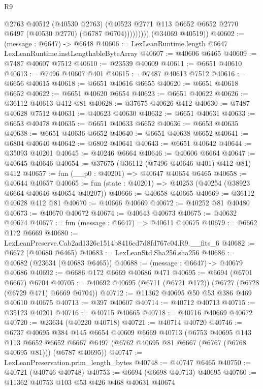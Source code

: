 \begin{lexlean}{R9}
\begin{coremodule}
                    @2763
                    @40512
                    (@40530 @2763)
                    (@40523 @2771 @113 @6652 @6652 @2770 @6497 (@40530 @2770) (@6787 @6704)))))))))
      (@34069 @40519))
@40602 := (message : @6647) -> @6648
@40606 := LexLeanRuntime.length @6647 LexLeanRuntime.instLengthableByteArray
@40607 := @40606 @6465
@40609 := @7487 @40607 @7512
@40610 := @23539 @40609
@40611 := @6651 @40610
@40613 := @7496 @40607 @401
@40615 := @7487 @40613 @7512
@40616 := @6656 @40615
@40618 := @6651 @40616 @6655
@40620 := @6651 @40618 @6652
@40622 := @6651 @40620 @6654
@40623 := @6651 @40622
@40626 := @36112 @40613 @412 @81
@40628 := @37675 @40626 @412
@40630 := @7487 @40628 @7512
@40631 := @40623 @40630
@40632 := @6651 @40631
@40633 := @6653 @40478
@40635 := @6651 @40633 @6652
@40636 := @6653 @40635
@40638 := @6651 @40636 @6652
@40640 := @6651 @40638 @6652
@40641 := @6804 @40640
@40642 := @6802 @40641
@40643 := @6651 @40642
@40644 := @35093 @40201
@40645 := @40246 @6664
@40646 := @40606 @6664
@40647 := @40645 @40646
@40654 := @37675 (@36112 (@7496 @40646 @401) @412 @81) @412
@40657 := fun (__p0 : @40201) => @40647 @40654 @6465
@40658 := @40644 @40657
@40665 := fun (state : @40201) => @40253 (@40254 (@38923 @6664 @40646 @40654 @40207))
@40666 := @40658 @40665
@40669 := @36112 @40628 @412 @81
@40670 := @40666 @40669
@40672 := @40252 @81 @40480
@40673 := @40670 @40672
@40674 := @40643 @40673
@40675 := @40632 @40674
@40677 := fun (message : @6647) => @40611 @40675
@40679 := @6662 @172 @6669
@40680 := LexLeanPreserve.Cab2ad1326c1514b8416cd7d8fd767c04.R9.__fits_6
@40682 := @6672 (@40680 @6465)
@40683 := LexLeanStd.Sha256.sha256
@40686 := @40682 (@23634 (@40683 @6465))
@40688 := (message : @6647) -> @40679 @40686
@40692 := @6686 @172 @6669 @40686 @471
@40695 := @6694 (@6701 @6667) @6704
@40705 := @40692 @40695 (@6711 (@6721 @172)) (@6727 (@6728 (@6729 @471) @6669 @6704))
@40712 := @11362 @40695 @50 @53 @386 @469 @40610 @40675
@40713 := @397 @40607
@40714 := @40712 @40713
@40715 := @35123 @40201
@40716 := @40715 @40665
@40718 := @40716 @40669 @40672
@40720 := @23634 (@40220 @40718)
@40721 := @40714 @40720
@40746 := @6737
    @40695
    @384
    @145
    @6654
    @40609
    @6669
    @40713
    (@6753
      @40695
      @143
      @113
      @6652
      @6652
      @6667
      @6497
      (@6762 @40695 @81 @6667 (@6767 (@6768 @40695 @81)))
      (@6787 @40695))
@40747 := LexLeanPreservation.prim_length_bytes
@40748 := @40747 @6465
@40750 := @40721 (@40746 @40748)
@40753 := @6694 (@6698 @40713) @40695
@40760 := @11362 @40753 @103 @53 @426 @468 @40631 @40674

\end{coremodule}
\end{lexlean}
